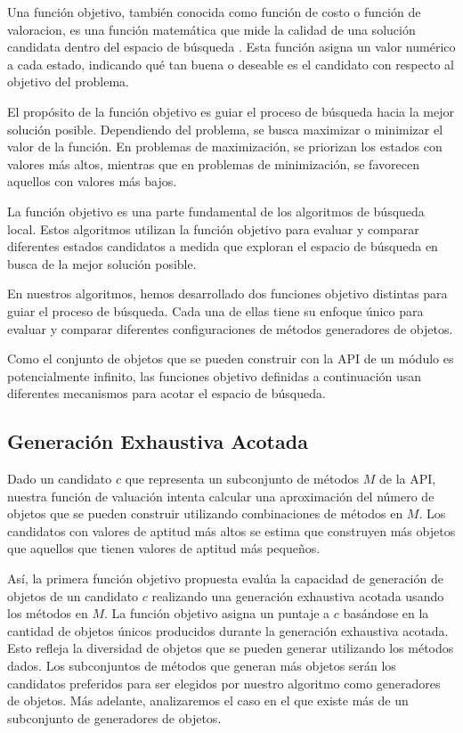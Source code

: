 Una función objetivo, también conocida como función de costo o función de valoracion, es una función matemática que mide la calidad de una solución candidata dentro del espacio de búsqueda \cite{}. Esta función asigna un valor numérico a cada estado, indicando qué tan buena o deseable es el candidato con respecto al objetivo del problema.

El propósito de la función objetivo es guiar el proceso de búsqueda hacia la mejor solución posible. Dependiendo del problema, se busca maximizar o minimizar el valor de la función. En problemas de maximización, se priorizan los estados con valores más altos, mientras que en problemas de minimización, se favorecen aquellos con valores más bajos.

La función objetivo es una parte fundamental de los algoritmos de búsqueda local. Estos algoritmos utilizan la función objetivo para evaluar y comparar diferentes estados candidatos a medida que exploran el espacio de búsqueda en busca de la mejor solución posible.

En nuestros algoritmos, hemos desarrollado dos funciones objetivo distintas para guiar el proceso de búsqueda. Cada una de ellas tiene su enfoque único para evaluar y comparar diferentes configuraciones de métodos generadores de objetos.

Como el conjunto de objetos que se pueden construir con la API de un módulo es potencialmente infinito, las funciones objetivo definidas a continuación usan diferentes mecanismos para acotar el espacio de búsqueda.


\subsection{Generación Exhaustiva Acotada}
\label{sec:fitnessGE}

Dado un candidato $c$ que representa un subconjunto de métodos $M$ de la API, nuestra función de valuación intenta calcular una aproximación del número de objetos que se pueden construir utilizando combinaciones de métodos en $M$. Los candidatos con valores de aptitud más altos se estima que construyen más objetos que aquellos que tienen valores de aptitud más pequeños.

Así, la primera función objetivo propuesta evalúa la capacidad de generación de objetos de un candidato $c$ realizando una generación exhaustiva acotada \cite{Politano20} usando los métodos en $M$. La función objetivo asigna un puntaje a $c$ basándose en la cantidad de objetos únicos producidos durante la generación exhaustiva acotada. Esto refleja la diversidad de objetos que se pueden generar utilizando los métodos dados. Los subconjuntos de métodos que generan más objetos serán los candidatos preferidos para ser elegidos por nuestro algoritmo como generadores de objetos. Más adelante, analizaremos el caso en el que existe más de un subconjunto de generadores de objetos.

